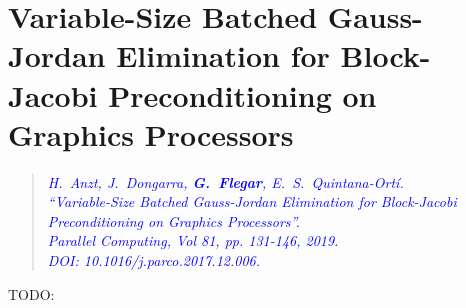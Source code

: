 \chapter{
    Variable-Size Batched Gauss-Jordan Elimination for Block-Jacobi
    Preconditioning on Graphics Processors}

\begin{quote}
\textcolor{blue}{\em \footnotesize
H.~Anzt, J.~Dongarra, \textbf{G.~Flegar}, E.~S.~Quintana-Ort\'{i}.\\
``Variable-Size Batched Gauss-Jordan Elimination for Block-Jacobi
Preconditioning on Graphics Processors''.\\
Parallel Computing, Vol 81, pp. 131-146, 2019. \\
DOI: 10.1016/j.parco.2017.12.006. \\
}
\end{quote}

TODO:
% 
